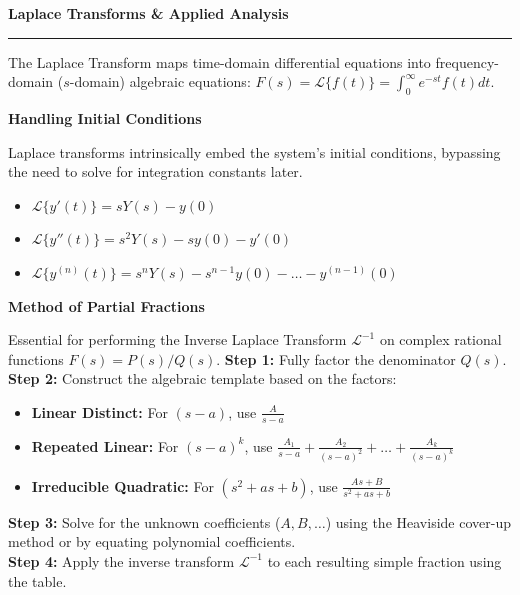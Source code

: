 \documentclass[10pt, landscape, twocolumn]{article}
\newcommand{\cheatsheetsection}[1]{
    \vspace{0.6em}
    {\color{themeblue}\large\bfseries #1} \par
    \vspace{-0.5em}
    {\color{themeblue}\rule{\linewidth}{1pt}} \par
    \vspace{0.2em}
}
\newcommand{\cheatsheetsubsection}[1]{
    \vspace{0.4em}
    {\color{themeblue}\normalsize\bfseries #1} \par
    \vspace{0.1em}
}
\begin{document}
\cheatsheetsection{Laplace Transforms \& Applied Analysis}
The Laplace Transform maps time-domain differential equations into frequency-domain ($s$-domain) algebraic equations: $F(s) = \mathcal{L}\{f(t)\} = \int_{0}^{\infty} e^{-st}f(t)dt$.

\cheatsheetsubsection{Handling Initial Conditions}
Laplace transforms intrinsically embed the system's initial conditions, bypassing the need to solve for integration constants later.
\begin{itemize}[leftmargin=*, nosep]
    \item $\mathcal{L}\{y'(t)\} = sY(s) - y(0)$
    \item $\mathcal{L}\{y''(t)\} = s^2Y(s) - sy(0) - y'(0)$
    \item $\mathcal{L}\{y^{(n)}(t)\} = s^nY(s) - s^{n-1}y(0) - \dots - y^{(n-1)}(0)$
\end{itemize}

\newpage
\cheatsheetsubsection{Method of Partial Fractions}
Essential for performing the Inverse Laplace Transform $\mathcal{L}^{-1}$ on complex rational functions $F(s) = P(s)/Q(s)$.
\textbf{Step 1:} Fully factor the denominator $Q(s)$. \\
\textbf{Step 2:} Construct the algebraic template based on the factors:
\begin{itemize}[leftmargin=*, nosep]
    \item \textbf{Linear Distinct:} For $(s-a)$, use $\frac{A}{s-a}$
    \item \textbf{Repeated Linear:} For $(s-a)^k$, use $\frac{A_1}{s-a} + \frac{A_2}{(s-a)^2} + \dots + \frac{A_k}{(s-a)^k}$
    \item \textbf{Irreducible Quadratic:} For $(s^2+as+b)$, use $\frac{As+B}{s^2+as+b}$
\end{itemize}
\textbf{Step 3:} Solve for the unknown coefficients ($A, B, \dots$) using the Heaviside cover-up method or by equating polynomial coefficients. \\
\textbf{Step 4:} Apply the inverse transform $\mathcal{L}^{-1}$ to each resulting simple fraction using the table.
\end{document}
